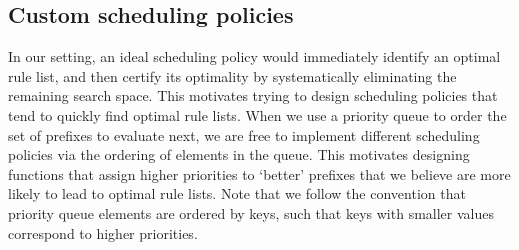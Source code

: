 \begin{kdd}
\vspace{-1mm}
\end{kdd}

\begin{arxiv}
\subsection{Custom scheduling policies}

In our setting, an ideal scheduling policy would immediately identify an optimal
rule list, and then certify its optimality by systematically eliminating the
remaining search space.
%
This motivates trying to design scheduling policies that tend to quickly find optimal rule lists.
%
When we use a priority queue to order the set of prefixes to evaluate next,
we are free to implement different scheduling policies via the ordering of
elements in the queue.
%
This motivates designing functions that assign higher priorities to `better'
prefixes that we believe are more likely to lead to optimal rule lists.
%
Note that we follow the convention that priority queue elements are ordered
by keys, such that keys with smaller values correspond to higher priorities.


\end{arxiv}
